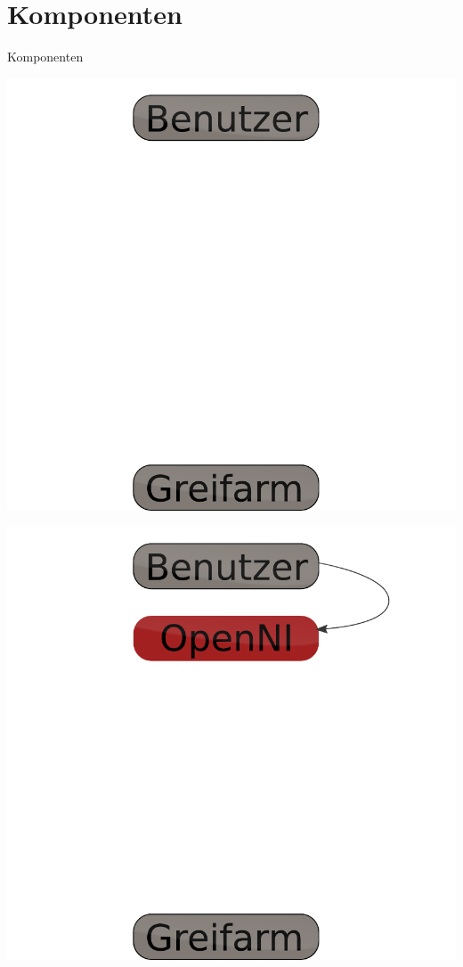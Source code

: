 \section{Komponenten}
\begin{frame}{Komponenten}

\begin{overprint}
 \begin{center}\includegraphics[height=0.8\textheight]{imgs/komponenten_1.pdf}\end{center}
 \begin{center}\includegraphics[height=0.8\textheight]{imgs/komponenten_2.pdf}\end{center}

\end{overprint}
\end{frame}
